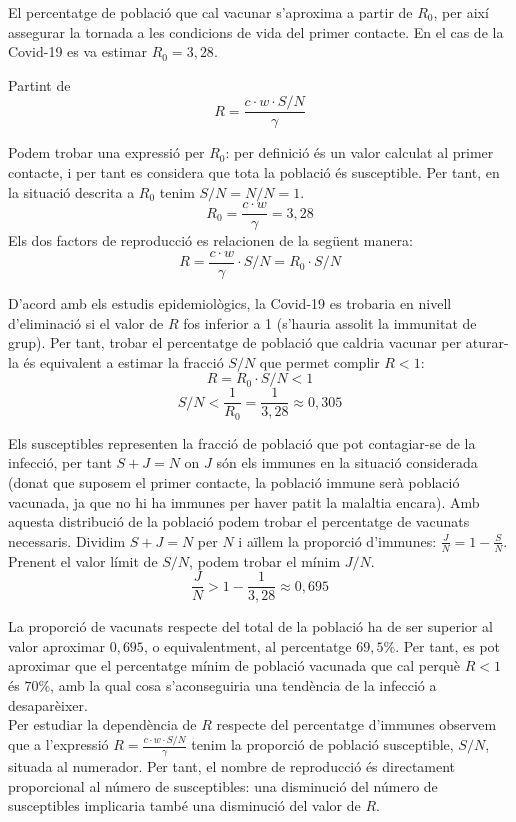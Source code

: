 \documentclass[11pt,a4paper]{article}
\begin{document}
	El percentatge de població que cal vacunar s'aproxima a partir de $R_0$, per així assegurar la tornada a les condicions de vida del primer contacte. En el cas de la Covid-19 es va estimar $R_0=3,28$.\cite{Liu}
	
	Partint de
	\[R=\frac{c\cdot w\cdot S/N}{\gamma}\] 
	
	Podem trobar una expressió per $R_0$: per definició és un valor calculat al primer contacte, i per tant es considera que tota la població és susceptible. Per tant, en la situació descrita a $R_0$ tenim $S/N=N/N=1$.\[R_0=\frac{c\cdot w}{\gamma}=3,28\]
	Els dos factors de reproducció es relacionen de la següent manera:
	\[R=\frac{c\cdot w}{\gamma}\cdot S/N=R_0\cdot S/N\]
	
	D'acord amb els estudis epidemiològics, la Covid-19 es trobaria en nivell d'eliminació si el valor de $R$ fos inferior a 1 (s'hauria assolit la immunitat de grup). Per tant, trobar el percentatge de població que caldria vacunar per aturar-la és equivalent a estimar la fracció $S/N$ que permet complir $R<1$:
	\[R=R_0\cdot S/N < 1\]
	\[S/N <\frac{1}{R_0}=\frac{1}{3,28} \approx 0,305\]
	
	Els susceptibles representen la fracció de població que pot contagiar-se de la infecció, per tant $S+J=N$ on $J$ són els immunes en la situació considerada (donat que suposem el primer contacte, la població immune serà població vacunada, ja que no hi ha immunes per haver patit la malaltia encara). Amb aquesta distribució de la població podem trobar el percentatge de vacunats necessaris. Dividim $S+J=N$ per $N$ i aïllem la proporció d'immunes:
	\(\frac{J}{N}=1-\frac{S}{N}\). Prenent el valor límit de $S/N$, podem trobar el mínim $J/N$.
	\[\frac{J}{N}>1-\frac{1}{3,28} \approx 0,695\]
	
	La proporció de vacunats respecte del total de la població ha de ser superior al valor aproximar $0,695$, o equivalentment, al percentatge $69,5\%$. Per tant, es pot aproximar que el percentatge mínim de població vacunada que cal perquè $R<1$ és $70\%$, amb la qual cosa s'aconseguiria una tendència de la infecció a desaparèixer.\\
	
	Per estudiar la dependència  de $R$ respecte del percentatge d'immunes observem que a l'expressió \(R=\frac{c\cdot w\cdot S/N}{\gamma}\) tenim la proporció de població susceptible, $S/N$, situada al numerador. Per tant, el nombre de reproducció és directament proporcional al número de susceptibles: una disminució del número de susceptibles implicaria també una disminució del valor de $R$.
	 
\end{document}
